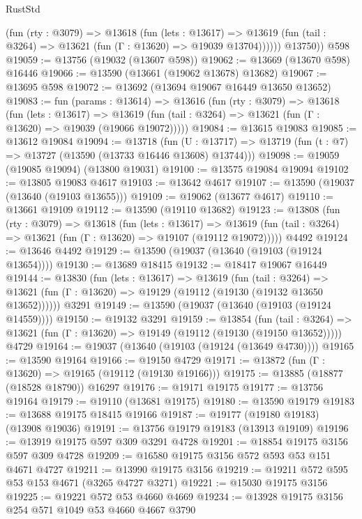 \begin{lexlean}{RustStd}
\begin{coremodule}
            (fun (rty : @3079) =>
            @13618
              (fun (lets : @13617) =>
              @13619 (fun (tail : @3264) => @13621 (fun (Γ : @13620) => @19039 @13704))))))
        @13750))
    @598
@19059 := @13756 (@19032 (@13607 @598))
@19062 := @13669 (@13670 @598) @16446
@19066 := @13590 (@13661 (@19062 @13678) @13682)
@19067 := @13695 @598
@19072 := @13692 (@13694 @19067 @16449 @13650 @13652)
@19083 := fun (params : @13614) =>
  @13616
    (fun (rty : @3079) =>
    @13618
      (fun (lets : @13617) =>
      @13619 (fun (tail : @3264) => @13621 (fun (Γ : @13620) => @19039 (@19066 @19072)))))
@19084 := @13615 @19083
@19085 := @13612 @19084
@19094 := @13718
    (fun (U : @13717) => @13719 (fun (t : @7) => @13727 (@13590 (@13733 @16446 @13608) @13744)))
@19098 := @19059 (@19085 @19094) (@13800 @19031)
@19100 := @13575 @19084 @19094
@19102 := @13805 @19083 @4617
@19103 := @13642 @4617
@19107 := @13590 (@19037 (@13640 (@19103 @13655)))
@19109 := @19062 (@13677 @4617)
@19110 := @13661 @19109
@19112 := @13590 (@19110 @13682)
@19123 := @13808
    (fun (rty : @3079) =>
    @13618
      (fun (lets : @13617) =>
      @13619 (fun (tail : @3264) => @13621 (fun (Γ : @13620) => @19107 (@19112 @19072)))))
    @4492
@19124 := @13646 @4492
@19129 := @13590 (@19037 (@13640 (@19103 (@19124 @13654))))
@19130 := @13689 @18415
@19132 := @18417 @19067 @16449
@19144 := @13830
    (fun (lets : @13617) =>
    @13619
      (fun (tail : @3264) =>
      @13621 (fun (Γ : @13620) => @19129 (@19112 (@19130 (@19132 @13650 @13652))))))
    @3291
@19149 := @13590 (@19037 (@13640 (@19103 (@19124 @14559))))
@19150 := @19132 @3291
@19159 := @13854
    (fun (tail : @3264) => @13621 (fun (Γ : @13620) => @19149 (@19112 (@19130 (@19150 @13652)))))
    @4729
@19164 := @19037 (@13640 (@19103 (@19124 (@13649 @4730))))
@19165 := @13590 @19164
@19166 := @19150 @4729
@19171 := @13872 (fun (Γ : @13620) => @19165 (@19112 (@19130 @19166)))
@19175 := @13885 (@18877 (@18528 @18790)) @16297
@19176 := @19171 @19175
@19177 := @13756 @19164
@19179 := @19110 (@13681 @19175)
@19180 := @13590 @19179
@19183 := @13688 @19175 @18415 @19166
@19187 := @19177 (@19180 @19183) (@13908 @19036)
@19191 := @13756 @19179 @19183 (@13913 @19109)
@19196 := @13919 @19175 @597 @309 @3291 @4728
@19201 := @18854 @19175 @3156 @597 @309 @4728
@19209 := @16580 @19175 @3156 @572 @593 @53 @151 @4671 @4727
@19211 := @13990 @19175 @3156
@19219 := @19211 @572 @595 @53 @153 @4671 (@3265 @4727 @3271)
@19221 := @15030 @19175 @3156
@19225 := @19221 @572 @53 @4660 @4669
@19234 := @13928 @19175 @3156 @254 @571 @1049 @53 @4660 @4667 @3790

\end{coremodule}
\end{lexlean}
